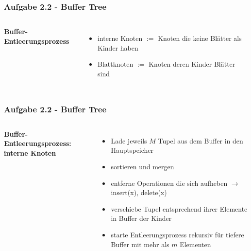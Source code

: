 \documentclass[aspectratio=169]{beamer}
\begin{document}
\begin{frame}
\frametitle{Aufgabe 2.2 - Buffer Tree}
\begin{columns}[c] %
	
	\textbf{Buffer-Entleerungsprozess}
	\begin{itemize}
		\item interne Knoten $:=$ Knoten die keine Blätter als Kinder haben
		\item Blattknoten $:=$ Knoten deren Kinder Blätter sind
	\end{itemize}
	

	
\end{columns}
\end{frame}

			

\begin{frame}
\frametitle{Aufgabe 2.2 - Buffer Tree}
\begin{columns}[c] %
	
	\textbf{Buffer-Entleerungsprozess: interne Knoten}
	\begin{itemize}
		\item Lade jeweils $M$ Tupel aus dem Buffer in den Hauptspeicher
		\item sortieren und mergen
		\item entferne Operationen die sich aufheben $\rightarrow$ insert(x), delete(x)
		\item verschiebe Tupel entsprechend ihrer Elemente in Buffer der Kinder
		\item starte Entleerungsprozess rekursiv für tiefere Buffer mit mehr als $m$ Elementen
	\end{itemize}
	

	
\end{columns}
\end{frame}

	
\end{document}
